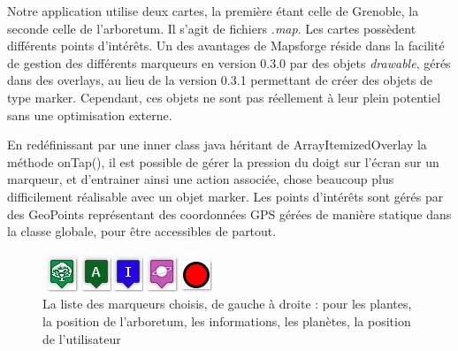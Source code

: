 \documentclass[a4paper,11pt]{article}
\begin{document}
		Notre application utilise deux cartes, la première étant celle de Grenoble, la seconde celle de l'arboretum. Il s'agit de fichiers \emph{.map}. 
		Les cartes possèdent différents points d'intérêts. Un des avantages de Mapsforge réside dans la facilité de gestion des différents marqueurs en version 0.3.0 par des objets \emph{drawable}, gérés dans des overlays, au lieu de la version 0.3.1 permettant de créer des objets de type marker. 
		Cependant, ces objets ne sont pas réellement à leur plein potentiel sans une optimisation externe. 
		
		En redéfinissant par une inner class java héritant de ArrayItemizedOverlay la méthode onTap(), 
		il est possible de gérer la pression du doigt sur l'écran sur un marqueur, et d'entrainer ainsi une action associée, 
		chose beaucoup plus difficilement réalisable avec un objet marker. 
		Les points d'intérêts sont gérés par des GeoPoints représentant des coordonnées GPS gérées de manière statique dans la classe globale, pour être accessibles de partout.
		
		 \begin{figure}[H]
     \begin{center}
      \includegraphics{listemarker.jpg}
      \caption{La liste des marqueurs choisis, de gauche à droite : pour les plantes, la position de l'arboretum, les informations, les planètes, la position de l'utilisateur}
     \end{center}
    \end{figure}
			
\end{document}
